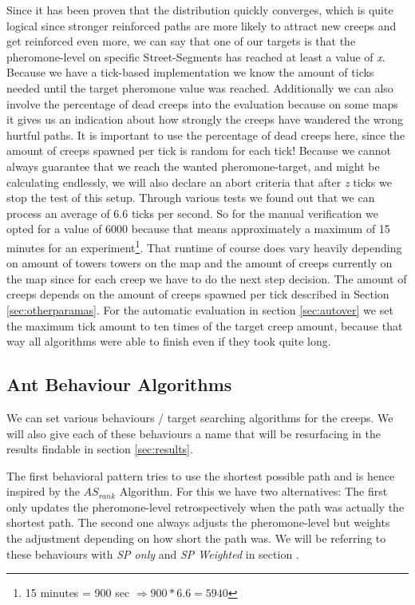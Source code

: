 Since it has been proven that the distribution quickly converges\cite[P. 15]{maniezzo2002ant}, which is quite logical since stronger reinforced paths are more likely to attract new creeps and get reinforced even more, we can say that one of our targets is that the pheromone-level on specific Street-Segments has reached at least a value of \textit{x}.
Because we have a tick-based implementation we know the amount of ticks needed until the target pheromone value was reached. Additionally we can also involve the percentage of dead creeps into the evaluation because on some maps it gives us an indication about how strongly the creeps have wandered  the wrong hurtful paths. It is important to use the percentage of dead creeps here, since the amount of creeps spawned per tick is random for each tick!
Because we cannot always guarantee that we reach the wanted pheromone-target, and might be calculating endlessly, we will also declare an abort criteria that after \textit{z} ticks we stop the test of this setup. Through various tests we found out that we can process an average of 6.6 ticks per second. So for the manual verification we opted for a value of 6000 because that means approximately a maximum of 15 minutes for an experiment\footnote{15 minutes = 900 sec  $\Rightarrow 900 * 6.6 = 5940$}. That runtime of course does vary heavily depending on amount of towers towers on the map and the amount of creeps currently on the map since for each creep we have to do the next step decision. The amount of creeps depends on the amount of creeps spawned per tick described in Section \ref{sec:otherparamas}.
For the automatic evaluation in section \ref{sec:autover} we set the maximum tick amount to ten times of the target creep amount, because that way all algorithms were able to finish even if they took quite long. 


\subsection{Ant Behaviour Algorithms}
\label{sec:behaviour}
We can set various behaviours / target searching algorithms for the creeps. We will also give each of these behaviours a name that will be resurfacing in the results findable in section \ref{sec:results}.

The first behavioral pattern tries to use the shortest possible path and is hence inspired by the $AS_{rank}$ Algorithm\cite{zecchin2007ant}.
For this we have two alternatives: The first only updates the pheromone-level retrospectively when the path was actually the shortest path. The second one always adjusts the pheromone-level but weights the adjustment depending on how short the path was.
We will be referring to these behaviours with \textit{SP only} and \textit{SP Weighted} in section .

